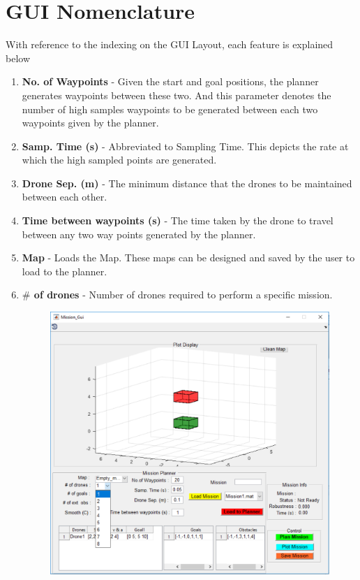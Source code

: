 \documentclass[english]{article}
\begin{document}
\section{GUI Nomenclature}
\item With reference to the indexing on the GUI Layout, each feature is explained below
\begin{enumerate}
    \item \textbf{No. of Waypoints} - Given the start and goal positions, the planner generates waypoints between these two. And this parameter denotes the number of high samples waypoints to be generated between each two waypoints given by the planner.
    \item \textbf{Samp. Time (s)} - Abbreviated to Sampling Time. This depicts the rate at which the high sampled points are generated.
    \item \textbf{Drone Sep. (m)} - The minimum distance that the drones to be maintained between each other.
    \item \textbf{Time between waypoints (s)} - The time taken by the drone to travel between any two way points generated by the planner.
    \item \textbf{Map} - Loads the Map. These maps can be designed and saved by the user to load to the planner.
    \item \textbf{$\#$ of drones} - Number of drones required to perform a specific mission.
    \begin{figure}[H]
        \centering
        \includegraphics[scale=0.5]{drones.pdf}

\end{figure}
\end{enumerate}
\end{document}

